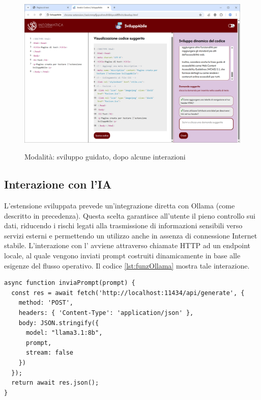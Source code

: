 \begin{figure}[H]
    \centering
    \includegraphics[width=1\linewidth, alt={Modalità di sviluppo guidato, dopo un'interazione}]{img/mg2.png}
    \caption{Modalità: sviluppo guidato, dopo alcune interazioni}\label{fig:mg2}
\end{figure}

\subsection{Interazione con l'IA}
\noindent L’estensione sviluppata prevede un’integrazione diretta con Ollama (come descritto in precedenza). Questa scelta garantisce all’utente il pieno controllo sui dati, riducendo i rischi legati alla trasmissione di informazioni sensibili verso servizi esterni e permettendo un utilizzo anche in assenza di connessione Internet stabile. L’interazione con l’ avviene attraverso chiamate HTTP ad un endpoint locale, al quale vengono inviati prompt costruiti dinamicamente in base alle esigenze del flusso operativo. Il codice \ref{lst:funzOllama} mostra tale interazione.

\begin{lstlisting}[style=jsStyle, caption={Funzione di interazione con Ollama}, label={lst:funzOllama}]
async function inviaPrompt(prompt) {
  const res = await fetch('http://localhost:11434/api/generate', {
    method: 'POST',
    headers: { 'Content-Type': 'application/json' },
    body: JSON.stringify({
      model: "llama3.1:8b",
      prompt,
      stream: false
    })
  });
  return await res.json();
}
\end{lstlisting}

